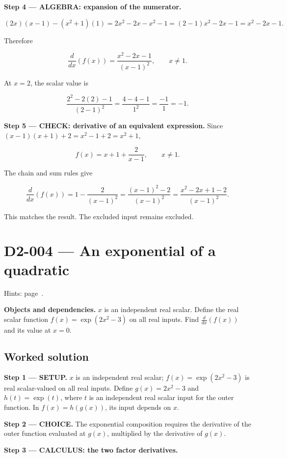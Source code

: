 \documentclass[11pt,oneside,openany]{book}
\begin{document}
\begingroup\color{AlgebraBlue}
\textbf{Step 4 --- ALGEBRA: expansion of the numerator.}

\[
(2x)(x-1)-(x^2+1)(1)
=2x^2-2x-x^2-1=(2-1)x^2-2x-1=x^2-2x-1.
\]

Therefore

\[
\frac{d}{dx}\left(f(x)\right)=\frac{x^2-2x-1}{(x-1)^2},\qquad x\ne1.
\]

At \(x=2\), the scalar value is

\[
\frac{2^2-2(2)-1}{(2-1)^2}=
\frac{4-4-1}{1^2}=\frac{-1}{1}=-1.
\]

\endgroup
\textbf{Step 5 --- CHECK: derivative of an equivalent expression.} Since
\((x-1)(x+1)+2=x^2-1+2=x^2+1\),

\[
f(x)=x+1+\frac{2}{x-1},\qquad x\ne1.
\]

The chain and sum rules give

\[
\frac{d}{dx}\left(f(x)\right)=1-\frac{2}{(x-1)^2}
=\frac{(x-1)^2-2}{(x-1)^2}
=\frac{x^2-2x+1-2}{(x-1)^2}.
\]

This matches the result. The excluded input remains excluded.
\clearpage
\section{D2-004 --- An exponential of a quadratic}
\label{problem:D2-004}
{\small Hints: page~\pageref{hints:D2-004}.}\par\medskip

\textbf{Objects and dependencies.} \(x\) is an independent real scalar. Define the real
scalar function \(f(x)=\exp(2x^2-3)\) on all real inputs. Find
\(\frac{d}{dx}\left(f(x)\right)\) and its value at \(x=0\).
\subsection*{Worked solution}

\textbf{Step 1 --- SETUP.} \(x\) is an independent real scalar;
\(f(x)=\exp(2x^2-3)\) is real scalar-valued on all real inputs. Define
\(g(x)=2x^2-3\) and \(h(t)=\exp(t)\), where \(t\) is an independent real scalar
input for the outer function. In \(f(x)=h(g(x))\), its input depends on \(x\).

\begin{ChoiceStep}
\textbf{Step 2 --- CHOICE.} The exponential composition requires the derivative of the outer
function evaluated at \(g(x)\), multiplied by the derivative of \(g(x)\).

\end{ChoiceStep}
\textbf{Step 3 --- CALCULUS: the two factor derivatives.}
\end{document}
